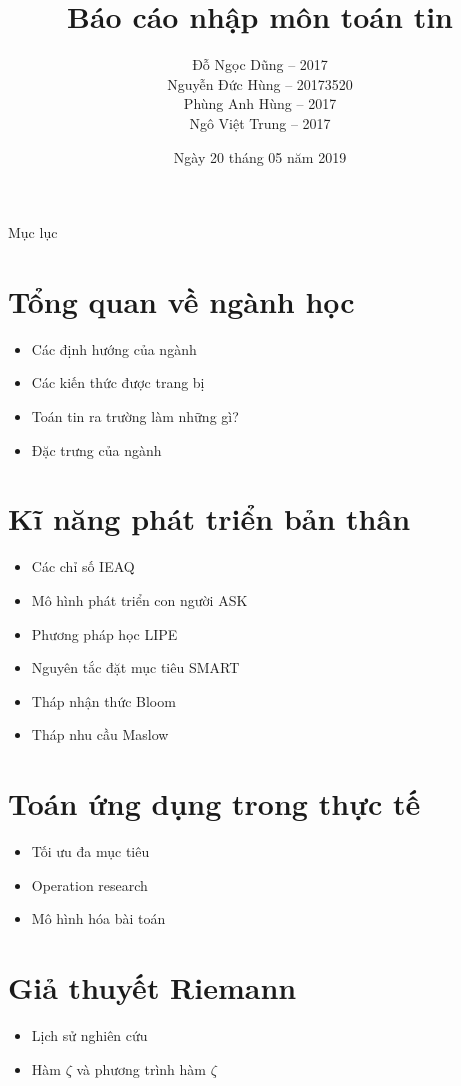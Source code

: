 \documentclass[aspectratio=43]{beamer}
\title{Báo cáo nhập môn toán tin}
\date{Ngày 20 tháng 05 năm 2019}
\author{
	Đỗ Ngọc Dũng -- 2017\\
	Nguyễn Đức Hùng -- 20173520\\
	Phùng Anh Hùng -- 2017\\
	Ngô Việt Trung -- 2017
}
\begin{document}
\begin{frame}
	\maketitle
\end{frame}

\begin{frame}{Mục lục}
\tableofcontents	
\end{frame}

\section{Tổng quan về ngành học}
\begin{frame}{\secname}	
	\begin{itemize}
		\item Các định hướng của ngành
		\item Các kiến thức được trang bị
		\item Toán tin ra trường làm những gì?
		\item Đặc trưng của ngành
	\end{itemize}
\end{frame}

\section{Kĩ năng phát triển bản thân}
\begin{frame}{\secname}
	\begin{itemize}
		\item Các chỉ số IEAQ
		\item Mô hình phát triển con người ASK
		\item Phương pháp học LIPE
		\item Nguyên tắc đặt mục tiêu SMART
		\item Tháp nhận thức Bloom
		\item Tháp nhu cầu Maslow
	\end{itemize}	
\end{frame}

\section{Toán ứng dụng trong thực tế}
\begin{frame}{\secname}
	\begin{itemize}
		\item Tối ưu đa mục tiêu
		\item Operation research
		\item Mô hình hóa bài toán
	\end{itemize}	
\end{frame}

\begin{frame}{\secname}
	
\end{frame}

\section{Giả thuyết Riemann}
\begin{frame}{\secname}
	\begin{itemize}
		\item Lịch sử nghiên cứu
		\item Hàm $\zeta$ và phương trình hàm $\zeta$
	\end{itemize}	
\end{frame}
\end{document}
